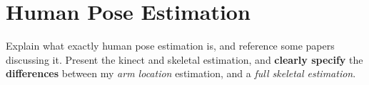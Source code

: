 \section{Human Pose Estimation}
\label{section: background - human pose estimation}
Explain what exactly human pose estimation is, and reference some papers discussing it. 
Present the kinect and skeletal estimation, and \textbf{clearly specify} the \textbf{differences} between my \textit{arm location} estimation, and a \textit{full skeletal estimation}.

